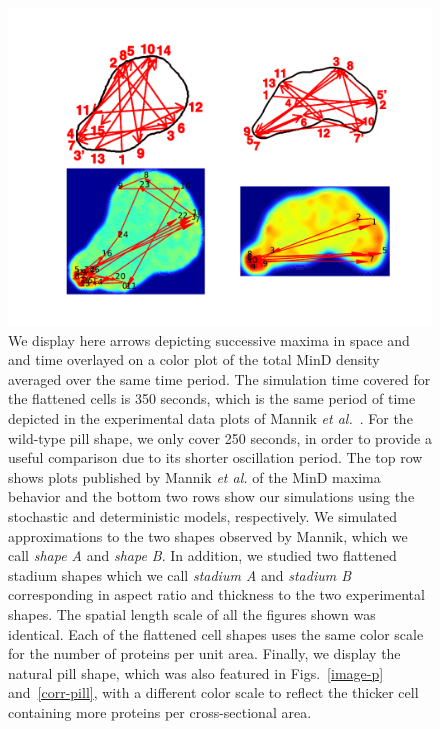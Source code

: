 \documentclass[10pt,letterpaper]{article}
\begin{document}
\begin{figure}
  \centering
  \hspace{-3cm}
  \vspace{1cm}
  \includegraphics[width=16cm]{../paper/plot-ave}
  \caption{We display here arrows depicting successive maxima in space
    and and time overlayed on a color plot of the total MinD density
    averaged over the same time period.  The simulation time covered
    for the flattened cells is 350 seconds, which is the same
    period of time depicted in the experimental data plots of Mannik
    \emph{et al.}~\cite{mannik2012robustness}.  For the wild-type pill
    shape, we only cover 250 seconds, in order to provide a
    useful comparison due to its shorter oscillation period.  The top
    row shows plots published by Mannik \emph{et al.} of the MinD maxima behavior
    and the bottom two rows show our simulations using the stochastic
    and deterministic models, respectively.  We simulated
    approximations to the two shapes observed by Mannik, which we call
    \emph{shape A} and \emph{shape B}.  In addition, we studied two
    flattened stadium shapes which we call \emph{stadium A} and
    \emph{stadium B} corresponding in aspect ratio and thickness to
    the two experimental shapes.  The spatial length scale of all the
    figures shown was identical. Each of the flattened cell shapes
    uses the same color scale for the number of proteins per unit
    area.  Finally, we display the natural pill shape, which was also
    featured in Figs.~\ref{image-p} and~\ref{corr-pill}, with a
    different color scale to reflect the thicker cell containing more
    proteins per cross-sectional area.  }
  \label{randst-plot-ave}
\end{figure}
\end{document}
